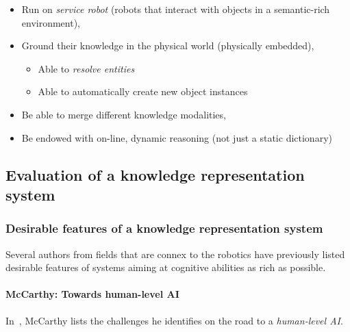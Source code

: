 \documentclass[a4paper, twocolumn]{article}
\begin{document}
\begin{itemize}
	\item  Run on \emph{service robot} (robots that interact with objects in a
	semantic-rich environment),

	\item  Ground their knowledge in the physical world (physically embedded),
	\begin{itemize}
		\item  Able to \emph{resolve entities}
		\item  Able to automatically create new object instances
	\end{itemize}

	\item  Be able to merge different knowledge modalities,
	\item  Be endowed with on-line, dynamic reasoning (not just a static
	dictionary)

\end{itemize}

\subsection{Evaluation of a knowledge representation system}
\label{sect|evaluation}


\subsubsection{Desirable features of a knowledge representation system}
\label{sect|evaluation-literature}

Several authors from fields that are connex to the robotics have previously listed desirable features of systems aiming at cognitive abilities as rich as possible.

\paragraph{McCarthy: Towards human-level AI}

In~\cite{McCarthy2007}, McCarthy lists the challenges he identifies on the road
to a \emph{human-level AI}.
\end{document}
